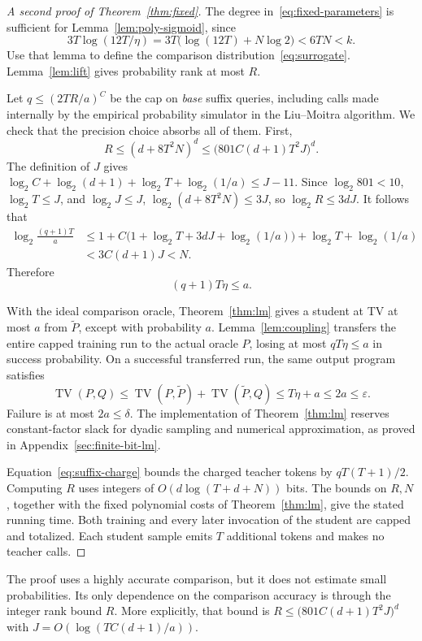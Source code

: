 \documentclass[11pt]{article}
\newcommand{\TV}{\operatorname{TV}}
\theoremstyle{definition}
\theoremstyle{remark}
\begin{document}
\begin{proof}[A second proof of Theorem~\ref{thm:fixed}]
The degree in~\eqref{eq:fixed-parameters} is sufficient for Lemma~\ref{lem:poly-sigmoid}, since
\[
3T\log(12T/\eta)
=3T\bigl(\log(12T)+N\log2\bigr)<6TN<k.
\]
Use that lemma to define the comparison distribution~\eqref{eq:surrogate}. Lemma~\ref{lem:lift} gives probability rank at most $R$.

Let $q\le(2TR/a)^C$ be the cap on \emph{base} suffix queries, including calls made internally by the empirical probability simulator in the Liu--Moitra algorithm. We check that the precision choice absorbs all of them. First,
\[
R\le(d+8T^2N)^d
\le\bigl(801C(d+1)T^2J\bigr)^d.
\]
The definition of $J$ gives
$\log_2C+\log_2(d+1)+\log_2T+\log_2(1/a)\le J-11$.
Since $\log_2 801<10$, $\log_2T\le J$, and $\log_2J\le J$,
$\log_2(d+8T^2N)\le3J$, so $\log_2R\le3dJ$. It follows that
\begin{align*}
\log_2\frac{(q+1)T}{a}
&\le1+C\bigl(1+\log_2T+3dJ+\log_2(1/a)\bigr)
+\log_2T+\log_2(1/a)\\
&<3C(d+1)J<N.
\end{align*}
Therefore
\begin{equation}\label{eq:combined-budget}
(q+1)T\eta\le a.
\end{equation}

With the ideal comparison oracle, Theorem~\ref{thm:lm} gives a student at TV at most $a$ from $\widetilde P$, except with probability $a$. Lemma~\ref{lem:coupling} transfers the entire capped training run to the actual oracle $P$, losing at most $qT\eta\le a$ in success probability. On a successful transferred run, the same output program satisfies
\[
\TV(P,Q)\le\TV(P,\widetilde P)+\TV(\widetilde P,Q)
\le T\eta+a\le2a\le\varepsilon.
\]
Failure is at most $2a\le\delta$. The implementation of Theorem~\ref{thm:lm} reserves constant-factor slack for dyadic sampling and numerical approximation, as proved in Appendix~\ref{sec:finite-bit-lm}.

Equation~\eqref{eq:suffix-charge} bounds the charged teacher tokens by $qT(T+1)/2$. Computing $R$ uses integers of $O(d\log(T+d+N))$ bits. The bounds on $R,N$, together with the fixed polynomial costs of Theorem~\ref{thm:lm}, give the stated running time. Both training and every later invocation of the student are capped and totalized. Each student sample emits $T$ additional tokens and makes no teacher calls.
\end{proof}

The proof uses a highly accurate comparison, but it does not estimate small probabilities. Its only dependence on the comparison accuracy is through the integer rank bound $R$. More explicitly, that bound is
$R\le\bigl(801C(d+1)T^2J\bigr)^d$ with $J=O(\log(TC(d+1)/a))$.
\end{document}
